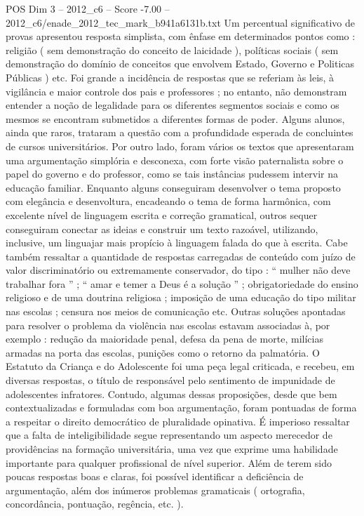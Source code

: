 \begin{textsample}{POS Dim 3 – 2012\_c6 – Score -7.00 – 2012\_c6/enade\_2012\_tec\_mark\_b941a6131b.txt}
Um percentual significativo de provas apresentou resposta simplista, com ênfase em determinados pontos como : religião ( sem demonstração do conceito de laicidade ), políticas sociais ( sem demonstração do domínio de conceitos que envolvem Estado, Governo e Politicas Públicas ) etc.
Foi grande a incidência de respostas que se referiam às leis, à vigilância e maior controle dos pais e professores ; no entanto, não demonstram entender a noção de legalidade para os diferentes segmentos sociais e como os mesmos se encontram submetidos a diferentes formas de poder.
Alguns alunos, ainda que raros, trataram a questão com a profundidade esperada de concluintes de cursos universitários.
Por outro lado, foram vários os textos que apresentaram uma argumentação simplória e desconexa, com forte visão paternalista sobre o papel do governo e do professor, como se tais instâncias pudessem intervir na educação familiar.
Enquanto alguns conseguiram desenvolver o tema proposto com elegância e desenvoltura, encadeando o tema de forma harmônica, com excelente nível de linguagem escrita e correção gramatical, outros sequer conseguiram conectar as ideias e construir um texto razoável, utilizando, inclusive, um linguajar mais propício à linguagem falada do que à escrita.
Cabe também ressaltar a quantidade de respostas carregadas de conteúdo com juízo de valor discriminatório ou extremamente conservador, do tipo : “ mulher não deve trabalhar fora ” ; “ amar e temer a Deus é a solução ” ; obrigatoriedade do ensino religioso e de uma doutrina religiosa ; imposição de uma educação do tipo militar nas escolas ; censura nos meios de comunicação etc.
Outras soluções apontadas para resolver o problema da violência nas escolas estavam associadas à, por exemplo : redução da maioridade penal, defesa da pena de morte, milícias armadas na porta das escolas, punições como o retorno da palmatória.
O Estatuto da Criança e do Adolescente foi uma peça legal criticada, e recebeu, em diversas respostas, o título de responsável pelo sentimento de impunidade de adolescentes infratores.
Contudo, algumas dessas proposições, desde que bem contextualizadas e formuladas com boa argumentação, foram pontuadas de forma a respeitar o direito democrático de pluralidade opinativa.
É imperioso ressaltar que a falta de inteligibilidade segue representando um aspecto merecedor de providências na formação universitária, uma vez que exprime uma habilidade importante para qualquer profissional de nível superior.
Além de terem sido poucas respostas boas e claras, foi possível identificar a deficiência de argumentação, além dos inúmeros problemas gramaticais ( ortografia, concordância, pontuação, regência, etc. ).

\end{textsample}

